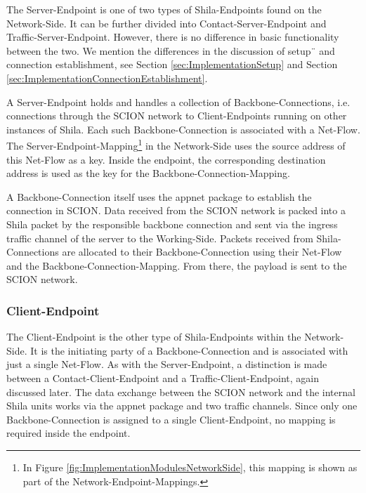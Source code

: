 The Server-Endpoint is one of two types of Shila-Endpoints found on the Network-Side. It can be further divided into Contact-Server-Endpoint and Traffic-Server-Endpoint. However, there is no difference in basic functionality between the two. We mention the differences in the discussion of setup¨ and connection establishment, see Section \ref{sec:ImplementationSetup} and Section \ref{sec:ImplementationConnectionEstablishment}.

A Server-Endpoint holds and handles a collection of Backbone-Connections, i.e. connections through the SCION network to Client-Endpoints running on other instances of Shila. Each such Backbone-Connection is associated with a Net-Flow. The Server-Endpoint-Mapping\footnote{In Figure \ref{fig:ImplementationModulesNetworkSide}, this mapping is shown as part of the Network-Endpoint-Mappings.} in the Network-Side uses the source address of this Net-Flow as a key. Inside the endpoint, the corresponding destination address is used as the key for the Backbone-Connection-Mapping. %

A Backbone-Connection itself uses the appnet package \cite{Appnet} to establish the connection in SCION. Data received from the SCION network is packed into a Shila packet by the responsible backbone connection and sent via the ingress traffic channel of the server to the Working-Side. Packets received from Shila-Connections are allocated to their Backbone-Connection using their Net-Flow and the Backbone-Connection-Mapping. From there, the payload is sent to the SCION network.

\subsubsection{Client-Endpoint}

The Client-Endpoint is the other type of Shila-Endpoints within the Network-Side. It is the initiating party of a Backbone-Connection and is associated with just a single Net-Flow. As with the Server-Endpoint, a distinction is made between a Contact-Client-Endpoint and a Traffic-Client-Endpoint, again discussed later. The data exchange between the SCION network and the internal Shila units works via the appnet package and two traffic channels. Since only one Backbone-Connection is assigned to a single Client-Endpoint, no mapping is required inside the endpoint.

